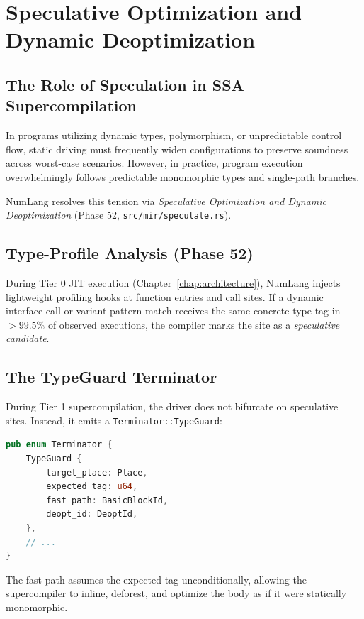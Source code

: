 \chapter{Speculative Optimization and Dynamic Deoptimization}
\label{chap:speculative}

\section{The Role of Speculation in SSA Supercompilation}
\label{sec:speculative:intro}

In programs utilizing dynamic types, polymorphism, or unpredictable control flow, static driving must frequently widen configurations to preserve soundness across worst-case scenarios. However, in practice, program execution overwhelmingly follows predictable monomorphic types and single-path branches.

NumLang resolves this tension via \emph{Speculative Optimization and Dynamic Deoptimization} (Phase 52, \texttt{src/mir/speculate.rs}).

\section{Type-Profile Analysis (Phase 52)}
\label{sec:speculative:profiling}

During Tier 0 JIT execution (Chapter~\ref{chap:architecture}), NumLang injects lightweight profiling hooks at function entries and call sites. If a dynamic interface call or variant pattern match receives the same concrete type tag in $>99.5\%$ of observed executions, the compiler marks the site as a \emph{speculative candidate}.

\section{The TypeGuard Terminator}
\label{sec:speculative:typeguard}

During Tier 1 supercompilation, the driver does not bifurcate on speculative sites. Instead, it emits a \texttt{Terminator::TypeGuard}:

\begin{lstlisting}[language=Rust, caption={The TypeGuard Terminator in NumLang.}]
pub enum Terminator {
    TypeGuard {
        target_place: Place,
        expected_tag: u64,
        fast_path: BasicBlockId,
        deopt_id: DeoptId,
    },
    // ...
}
\end{lstlisting}

The fast path assumes the expected tag unconditionally, allowing the supercompiler to inline, deforest, and optimize the body as if it were statically monomorphic.

